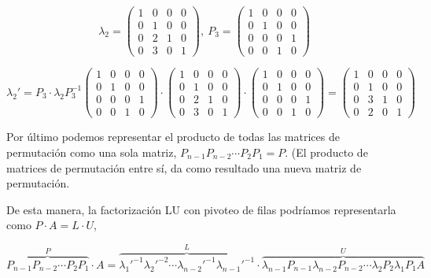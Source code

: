 \begin{equation*}
\lambda_2=
\begin{pmatrix}
1& 0& 0& 0\\
0& 1& 0& 0\\
0& 2& 1& 0\\
0& 3& 0& 1
\end{pmatrix}, \ 
P_3=
\begin{pmatrix}
1& 0& 0& 0\\
0& 1& 0& 0\\
0& 0& 0& 1\\
0& 0& 1& 0
\end{pmatrix}
\end{equation*}

\begin{equation*}
\lambda_2'=P_3\cdot \lambda_2 P_3^{-1}
\begin{pmatrix}
1& 0& 0& 0\\
0& 1& 0& 0\\
0& 0& 0& 1\\
0& 0& 1& 0
\end{pmatrix}\cdot \begin{pmatrix}
1& 0& 0& 0\\
0& 1& 0& 0\\
0& 2& 1& 0\\
0& 3& 0& 1
\end{pmatrix} \cdot \begin{pmatrix}
1& 0& 0& 0\\
0& 1& 0& 0\\
0& 0& 0& 1\\
0& 0& 1& 0
\end{pmatrix} = \begin{pmatrix}
1& 0& 0& 0\\
0& 1& 0& 0\\
0& 3& 1& 0\\
0& 2& 0& 1
\end{pmatrix}
\end{equation*}

Por último podemos representar el producto de todas las matrices de permutación como una sola matriz, $P_{n-1}P_{n-2} \cdots P_2  P_1=P$. (El producto de matrices de permutación entre sí, da como resultado una nueva matriz de permutación.

 
De esta manera, la factorización LU con pivoteo de filas podríamos representarla como $P\cdot A=L\cdot U$,

\begin{equation*}
\overbrace{P_{n-1}P_{n-2} \cdots P_2  P_1}^{P}\cdot  A= \overbrace{\lambda_1'^{-1} \lambda_2'^{-2} \cdots \lambda_{n-2}'^{-1} \lambda_{n-1}'^{-1}}^{L}\cdot \overbrace{\lambda_{n-1}P_{n-1}\lambda_{n-2}P_{n-2} \cdots  \lambda_2  P_2 \lambda_1  P_1 A }^{U}   
\end{equation*}

